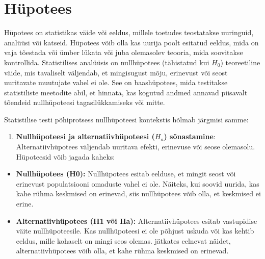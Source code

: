 \documentclass[
]{book}
\providecommand{\tightlist}{%
  \setlength{\itemsep}{0pt}\setlength{\parskip}{0pt}}
\begin{document}
\section{Hüpotees}\label{huxfcpotees}

Hüpotees on statistikas väide või eeldus, millele toetudes teostatakse uuringuid, analüüsi või katseid. Hüpotees võib olla kas uurija poolt esitatud eeldus, mida on vaja tõestada või ümber lükata või juba olemasolev teooria, mida soovitakse kontrollida. Statistilises analüüsis on nullhüpotees (tähistatud kui \(H_0\)) teoreetiline väide, mis tavaliselt väljendab, et mingisugust mõju, erinevust või seost uuritavate muutujate vahel ei ole. See on baashüpotees, mida testitakse statistiliste meetodite abil, et hinnata, kas kogutud andmed annavad piisavalt tõendeid nullhüpoteesi tagasilükkamiseks või mitte.

Statistilise testi põhiprotsess nullhüpoteesi kontekstis hõlmab järgmisi samme:

\begin{enumerate}
\def\labelenumi{\arabic{enumi}.}
\tightlist
\item
  \textbf{Nullhüpoteesi ja alternatiivhüpoteesi (\(H_a\)) sõnastamine}: Alternatiivhüpotees väljendab uuritava efekti, erinevuse või seose olemasolu. Hüpoteesid võib jagada kaheks:
\end{enumerate}

\begin{itemize}
\item
  \textbf{Nullhüpotees (H0):} Nullhüpotees esitab eelduse, et mingit seost või erinevust populatsiooni omaduste vahel ei ole. Näiteks, kui soovid uurida, kas kahe rühma keskmised on erinevad, siis nullhüpotees võib olla, et keskmised ei erine.
\item
  \textbf{Alternatiivhüpotees (H1 või Ha):} Alternatiivhüpotees esitab vastupidise väite nullhüpoteesile. Kas nullhüpoteesi ei ole põhjust uskuda või kas kehtib eeldus, mille kohaselt on mingi seos olemas. jätkates eelnevat näidet, alternatiivhüpotees võib olla, et kahe rühma keskmised on erinevad.
\end{itemize}
\end{document}
